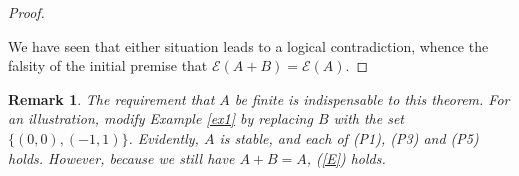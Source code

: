 \documentclass[pdflatex,sn-apa,11pt]{sn-jnl}%
\newtheorem{example}{Example}%
\newtheorem{remark}{Remark}%
\begin{document}
\begin{proof}
\begin{itemize}
\end{itemize}
We have seen that either situation leads to a logical contradiction, whence the falsity of the initial premise that $\mathscr{E}(A+B) = \mathscr{E}(A)$.
\end{proof}

\begin{remark}
\label{rem_thm7}
The requirement that $A$ be finite is indispensable to this theorem. For an illustration, modify Example \ref{ex1} by replacing $B$ with the set $\{(0, 0), (-1, 1)\}$. Evidently, $A$ is stable, and each of (P1), (P3) and (P5) holds. However, because we still have $A+B = A$, (\ref{E}) holds.
\end{remark}

\end{document}
